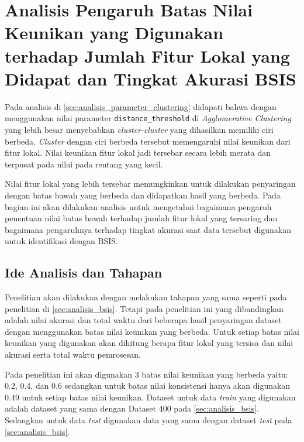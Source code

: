 \section{Analisis Pengaruh Batas Nilai Keunikan yang Digunakan terhadap Jumlah Fitur Lokal yang Didapat dan Tingkat Akurasi BSIS}
\label{sec:analisis_batas_keunikan}
Pada analisis di \ref{sec:analisis_parameter_clustering} didapati bahwa dengan menggunakan nilai parameter \texttt{distance\_threshold} di \textit{Agglomerative Clustering} yang lebih besar menyebabkan \textit{cluster-cluster} yang dihasilkan memiliki ciri berbeda. \textit{Cluster} dengan ciri berbeda tersebut memengaruhi nilai keunikan dari fitur lokal. Nilai keunikan fitur lokal jadi tersebar secara lebih merata dan terpusat pada nilai pada rentang yang kecil.

Nilai fitur lokal yang lebih tersebar memungkinkan untuk dilakukan penyaringan dengan batas bawah yang berbeda dan didapatkan hasil yang berbeda. Pada bagian ini akan dilakukan analisis untuk mengetahui bagaimana pengaruh penentuan nilai batas bawah terhadap jumlah fitur lokal yang tersaring dan bagaimana pengaruhnya terhadap tingkat akurasi saat data tersebut digunakan untuk identifikasi dengan BSIS.

\subsection{Ide Analisis dan Tahapan}
Penelitian akan dilakukan dengan melakukan tahapan yang sama seperti pada penelitian di \ref{sec:analisis_bsis}. Tetapi pada penelitian ini yang dibandingkan adalah nilai akurasi dan total waktu dari beberapa hasil penyaringan dataset dengan menggunakan batas nilai keunikan yang berbeda. Untuk setiap batas nilai keunikan yang digunakan akan dihitung berapa fitur lokal yang tersisa dan nilai akurasi serta total waktu pemrosesan.

Pada penelitian ini akan digunakan 3 batas nilai keunikan yang berbeda yaitu: 0.2, 0.4, dan 0.6 sedangkan untuk batas nilai konsistensi hanya akan digunakan 0.49 untuk setiap batas nilai keunikan. Dataset untuk data \textit{train} yang digunakan adalah dataset yang sama dengan Dataset 400 pada \ref{sec:analisis_bsis}. Sedangkan untuk data \textit{test} digunakan data yang sama dengan dataset \textit{test} pada \ref{sec:analisis_bsis}.

